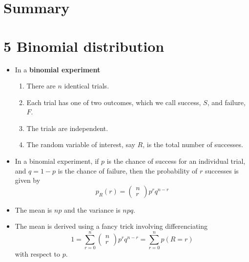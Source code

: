 
\ifind
\section*{Summary}
\else
\section*{5 Binomial distribution}
\fi


\begin{itemize}
\item In a \textbf{binomial experiment}  
\begin{enumerate}
\item There are $n$ identical trials.
\item Each trial has one of two outcomes, which we call success, $S$,
  and failure, $F$.
\item The trials are independent.
\item The random variable of interest, say $R$, is the total number of successes.
\end{enumerate}
\item In a binomial experiment, if $p$ is the chance of success for an individual trial, and $q=1-p$ is the chance of failure, then the probability of $r$ successes is given by
\begin{equation}
p_R(r)=\left(\begin{array}{c}n\\r\end{array}\right)p^rq^{n-r}
\end{equation}
\item The mean is $np$ and the variance is $npq$.
\item The mean is derived using a fancy trick involving differenciating
  \begin{equation}
  1=\sum_{r=0}^n \left(\begin{array}{c}n\\r\end{array}\right)p^rq^{n-r}=\sum_{r=0}^np(R=r)
  \end{equation}
  with respect to $p$.
\end{itemize}
